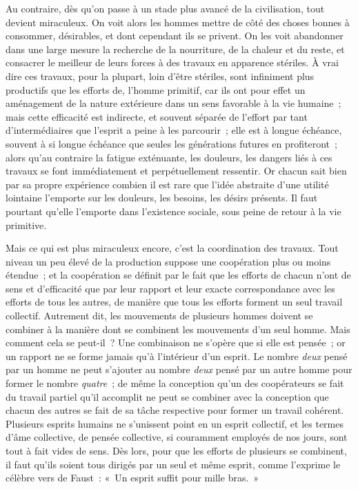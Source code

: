 \documentclass[french,twoside]{book} %
\begin{document}
Au contraire, dès qu'on passe à un stade plus avancé de la civilisation, tout devient miraculeux. On voit alors les hommes mettre de côté des choses bonnes à consommer, désirables, et dont cependant ils se privent. On les voit abandonner dans une large mesure la recherche de la nourriture, de la chaleur et du reste, et consacrer le meilleur de leurs forces à des travaux en apparence stériles. À vrai dire ces travaux, pour la plupart, loin d'être stériles, sont infiniment plus productifs que les efforts de, l'homme primitif, car ils ont pour effet un aménagement de la nature extérieure dans un sens favorable à la vie humaine ; mais cette efficacité est indirecte, et souvent séparée de l'effort par tant d'intermédiaires que l'esprit a peine à les parcourir ; elle est à longue échéance, souvent à si longue échéance que seules les générations futures en profiteront ; alors qu'au contraire la fatigue exténuante, les douleurs, les dangers liés à ces travaux se font immédiatement et perpétuellement ressentir. Or chacun sait bien par sa propre expérience combien il est rare que l'idée abstraite d'une utilité lointaine l'emporte sur les douleurs, les besoins, les désirs présents. Il faut pourtant qu'elle l'emporte dans l'existence sociale, sous peine de retour à la vie primitive.\par
Mais ce qui est plus miraculeux encore, c'est la coordination des travaux. Tout niveau un peu élevé de la production suppose une coopération plus ou moins étendue ; et la coopération se définit par le fait que les efforts de chacun n'ont de sens et d'efficacité que par leur rapport et leur exacte correspondance avec les efforts de tous les autres, de manière que tous les efforts forment un seul travail collectif. Autrement dit, les mouvements de plusieurs hommes doivent se combiner à la manière dont se combinent les mouvements d'un seul homme. Mais comment cela se peut-il ? Une combinaison ne s'opère que si elle est pensée ; or un rapport ne se forme jamais qu'à l'intérieur d'un esprit. Le nombre {\itshape deux} pensé par un homme ne peut s'ajouter au nombre {\itshape deux} pensé par un autre homme pour former le nombre {\itshape quatre} ; de même la conception qu'un des coopérateurs se fait du travail partiel qu'il accomplit ne peut se combiner avec la conception que chacun des autres se fait de sa tâche respective pour former un travail cohérent. Plusieurs esprits humains ne s'unissent point en un esprit collectif, et les termes d'âme collective, de pensée collective, si couramment employés de nos jours, sont tout à fait vides de sens. Dès lors, pour que les efforts de plusieurs se combinent, il faut qu’ils soient tous dirigés par un seul et même esprit, comme l'exprime le célèbre vers de Faust : « Un esprit suffit pour mille bras. »\par
\end{document}
